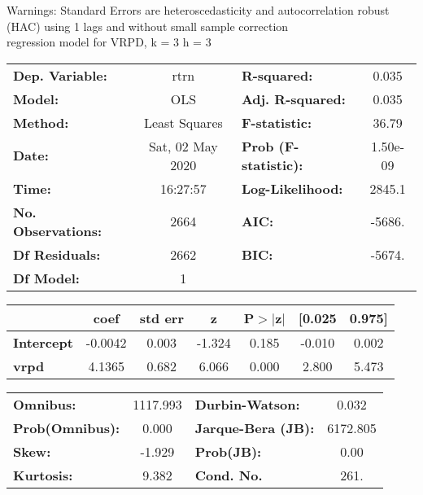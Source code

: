 Warnings: \newline
 [1] Standard Errors are heteroscedasticity and autocorrelation robust (HAC) using 1 lags and without small sample correction\\ 

regression model for VRPD, k = 3 h = 3\begin{center}
\begin{tabular}{lclc}
\toprule
\textbf{Dep. Variable:}    &       rtrn       & \textbf{  R-squared:         } &     0.035   \\
\textbf{Model:}            &       OLS        & \textbf{  Adj. R-squared:    } &     0.035   \\
\textbf{Method:}           &  Least Squares   & \textbf{  F-statistic:       } &     36.79   \\
\textbf{Date:}             & Sat, 02 May 2020 & \textbf{  Prob (F-statistic):} &  1.50e-09   \\
\textbf{Time:}             &     16:27:57     & \textbf{  Log-Likelihood:    } &    2845.1   \\
\textbf{No. Observations:} &        2664      & \textbf{  AIC:               } &    -5686.   \\
\textbf{Df Residuals:}     &        2662      & \textbf{  BIC:               } &    -5674.   \\
\textbf{Df Model:}         &           1      & \textbf{                     } &             \\
\bottomrule
\end{tabular}
\begin{tabular}{lcccccc}
                   & \textbf{coef} & \textbf{std err} & \textbf{z} & \textbf{P$> |$z$|$} & \textbf{[0.025} & \textbf{0.975]}  \\
\midrule
\textbf{Intercept} &      -0.0042  &        0.003     &    -1.324  &         0.185        &       -0.010    &        0.002     \\
\textbf{vrpd}      &       4.1365  &        0.682     &     6.066  &         0.000        &        2.800    &        5.473     \\
\bottomrule
\end{tabular}
\begin{tabular}{lclc}
\textbf{Omnibus:}       & 1117.993 & \textbf{  Durbin-Watson:     } &    0.032  \\
\textbf{Prob(Omnibus):} &   0.000  & \textbf{  Jarque-Bera (JB):  } & 6172.805  \\
\textbf{Skew:}          &  -1.929  & \textbf{  Prob(JB):          } &     0.00  \\
\textbf{Kurtosis:}      &   9.382  & \textbf{  Cond. No.          } &     261.  \\
\bottomrule
\end{tabular}
\end{center}


